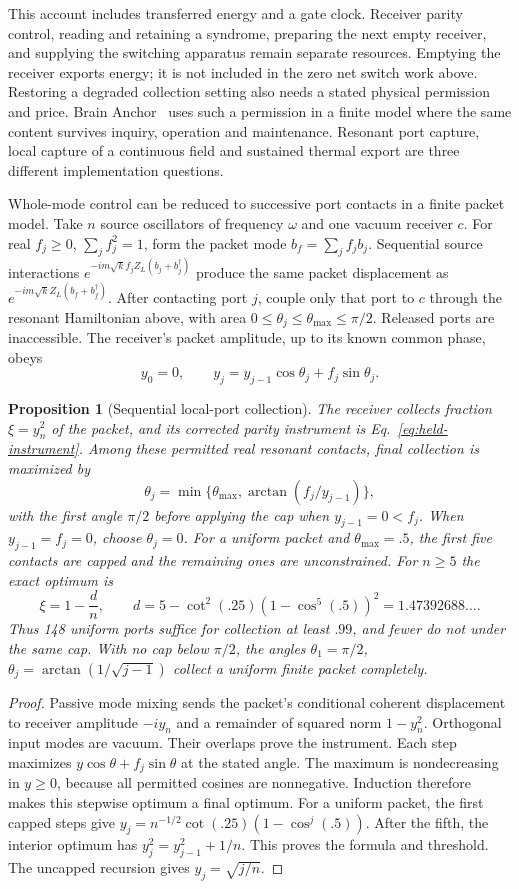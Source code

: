 \documentclass[aps,pre,onecolumn,superscriptaddress,floatfix,longbibliography]{revtex4-2}
\newtheorem{proposition}[theorem]{Proposition}
\begin{document}
This account includes transferred energy and a gate clock. Receiver parity
control, reading and retaining a syndrome, preparing the next empty receiver,
and supplying the switching apparatus remain separate resources. Emptying the
receiver exports energy; it is not included in the zero net switch work above.
Restoring a degraded collection setting also needs a stated physical permission
and price. Brain Anchor~\cite{Liu2026Brain} uses such a permission in a finite
model where the same content survives inquiry, operation and maintenance.
Resonant port capture, local capture of a continuous field and sustained
thermal export are three different implementation questions.

Whole-mode control can be reduced to successive port contacts in a finite
packet model. Take $n$ source oscillators of frequency $\omega$ and one
vacuum receiver $c$. For real $f_j\ge0$, $\sum_jf_j^2=1$, form the packet
mode $b_f=\sum_jf_jb_j$. Sequential source interactions
$e^{-im\sqrt{k}f_jZ_L(b_j+b_j^\dagger)}$ produce the same packet displacement
as $e^{-im\sqrt{k}Z_L(b_f+b_f^\dagger)}$. After contacting port $j$, couple
only that port to $c$ through the resonant Hamiltonian above, with area
$0\le\theta_j\le\theta_{\max}\le\pi/2$. Released ports are inaccessible.
The receiver's packet amplitude, up to its known common phase, obeys
\[
 y_0=0,\qquad y_j=y_{j-1}\cos\theta_j+f_j\sin\theta_j.
\]

\begin{proposition}[Sequential local-port collection]
\label{prop:packet-collection}
The receiver collects fraction $\xi=y_n^2$ of the packet, and its corrected
parity instrument is Eq.~\eqref{eq:held-instrument}. Among these permitted
real resonant contacts, final collection is maximized by
\[
 \theta_j=\min\{\theta_{\max},\arctan(f_j/y_{j-1})\},
\]
with the first angle $\pi/2$ before applying the cap when $y_{j-1}=0<f_j$.
When $y_{j-1}=f_j=0$, choose $\theta_j=0$.
For a uniform packet and $\theta_{\max}=.5$, the first five contacts are
capped and the remaining ones are unconstrained. For $n\ge5$ the exact
optimum is
\[
 \xi=1-\frac d n,\qquad
 d=5-\cot^2(.25)(1-\cos^5(.5))^2=1.47392688\ldots.
\]
Thus 148 uniform ports suffice for collection at least $.99$, and fewer
do not under the same cap. With no cap below $\pi/2$, the angles
$\theta_1=\pi/2$, $\theta_j=\arctan(1/\sqrt{j-1})$ collect a uniform
finite packet completely.
\end{proposition}
\begin{proof}
Passive mode mixing sends the packet's conditional coherent displacement
to receiver amplitude $-i y_n$ and a remainder of squared norm $1-y_n^2$.
Orthogonal input modes are vacuum. Their overlaps prove the instrument.
Each step maximizes $y\cos\theta+f_j\sin\theta$ at the stated angle.
The maximum is nondecreasing in $y\ge0$, because all permitted cosines
are nonnegative. Induction therefore makes this stepwise optimum a final
optimum. For a uniform packet, the first capped steps give
$y_j=n^{-1/2}\cot(.25)(1-\cos^j(.5))$. After the fifth, the interior
optimum has $y_j^2=y_{j-1}^2+1/n$. This proves the formula and threshold.
The uncapped recursion gives $y_j=\sqrt{j/n}$.
\end{proof}
\end{document}
